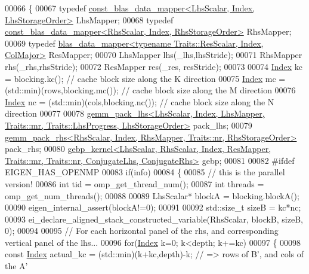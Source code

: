 \begin{DoxyCode}
00066 \{
00067   \textcolor{keyword}{typedef} \hyperlink{class_eigen_1_1internal_1_1const__blas__data__mapper}{const\_blas\_data\_mapper<LhsScalar, Index, LhsStorageOrder>}
       LhsMapper;
00068   \textcolor{keyword}{typedef} \hyperlink{class_eigen_1_1internal_1_1const__blas__data__mapper}{const\_blas\_data\_mapper<RhsScalar, Index, RhsStorageOrder>}
       RhsMapper;
00069   \textcolor{keyword}{typedef} \hyperlink{class_eigen_1_1internal_1_1blas__data__mapper}{blas\_data\_mapper<typename Traits::ResScalar, Index, ColMajor>}
       ResMapper;
00070   LhsMapper lhs(\_lhs,lhsStride);
00071   RhsMapper rhs(\_rhs,rhsStride);
00072   ResMapper res(\_res, resStride);
00073 
00074   \hyperlink{namespace_eigen_a62e77e0933482dafde8fe197d9a2cfde}{Index} kc = blocking.kc();                   \textcolor{comment}{// cache block size along the K direction}
00075   \hyperlink{namespace_eigen_a62e77e0933482dafde8fe197d9a2cfde}{Index} mc = (std::min)(rows,blocking.mc());  \textcolor{comment}{// cache block size along the M direction}
00076   \hyperlink{namespace_eigen_a62e77e0933482dafde8fe197d9a2cfde}{Index} nc = (std::min)(cols,blocking.nc());  \textcolor{comment}{// cache block size along the N direction}
00077 
00078   
      \hyperlink{struct_eigen_1_1internal_1_1gemm__pack__lhs}{gemm\_pack\_lhs<LhsScalar, Index, LhsMapper, Traits::mr, Traits::LhsProgress, LhsStorageOrder>}
       pack\_lhs;
00079   \hyperlink{struct_eigen_1_1internal_1_1gemm__pack__rhs}{gemm\_pack\_rhs<RhsScalar, Index, RhsMapper, Traits::nr, RhsStorageOrder>}
       pack\_rhs;
00080   
      \hyperlink{struct_eigen_1_1internal_1_1gebp__kernel}{gebp\_kernel<LhsScalar, RhsScalar, Index, ResMapper, Traits::mr, Traits::nr, ConjugateLhs, ConjugateRhs>}
       gebp;
00081 
00082 \textcolor{preprocessor}{#ifdef EIGEN\_HAS\_OPENMP}
00083   \textcolor{keywordflow}{if}(info)
00084   \{
00085     \textcolor{comment}{// this is the parallel version!}
00086     \textcolor{keywordtype}{int} tid = omp\_get\_thread\_num();
00087     \textcolor{keywordtype}{int} threads = omp\_get\_num\_threads();
00088 
00089     LhsScalar* blockA = blocking.blockA();
00090     eigen\_internal\_assert(blockA!=0);
00091 
00092     std::size\_t sizeB = kc*nc;
00093     ei\_declare\_aligned\_stack\_constructed\_variable(RhsScalar, blockB, sizeB, 0);
00094 
00095     \textcolor{comment}{// For each horizontal panel of the rhs, and corresponding vertical panel of the lhs...}
00096     \textcolor{keywordflow}{for}(\hyperlink{namespace_eigen_a62e77e0933482dafde8fe197d9a2cfde}{Index} k=0; k<depth; k+=kc)
00097     \{
00098       \textcolor{keyword}{const} \hyperlink{namespace_eigen_a62e77e0933482dafde8fe197d9a2cfde}{Index} actual\_kc = (std::min)(k+kc,depth)-k; \textcolor{comment}{// => rows of B', and cols of the A'}

\end{DoxyCode}
